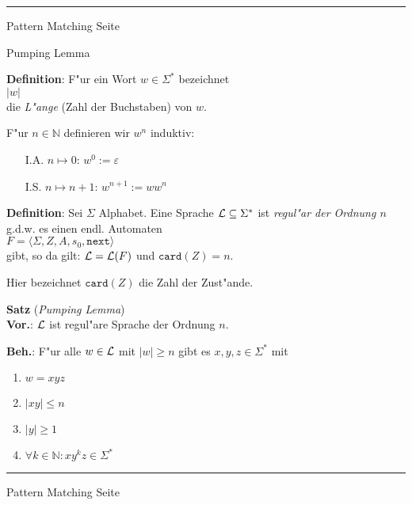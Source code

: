\begin{slide}{}
\vspace*{\fill}
\tiny \addtocounter{mypage}{1}
\rule{17cm}{1mm}
Pattern Matching \hspace*{\fill} Seite 
\end{slide}


\begin{slide}{}
\normalsize

\begin{center}
Pumping Lemma
\end{center}
\vspace*{0.5cm}

\footnotesize
\textbf{Definition}: F"ur ein Wort $w \in \Sigma^*$ bezeichnet \\[0.3cm]
\hspace*{1.3cm} $|w|$ \\[0.3cm]
die \emph{L"ange} (Zahl der Buchstaben) von $w$.

F"ur $n \in \mathbb{N}$ definieren wir $w^n$ induktiv:
\begin{enumerate}
\item[I.A.] $n \mapsto 0$:   \hspace*{2.5cm} $w^0 := \varepsilon$
\item[I.S.] $n \mapsto n+1$: \hspace*{1.3cm} $w^{n+1} := w w^n$

\end{enumerate}

\textbf{Definition}: Sei $\Sigma$ Alphabet. Eine Sprache ${\cal L} \subseteq \Sigma^*$
ist \emph{regul"ar der Ordnung $n$} g.d.w. es einen endl. Automaten \\[0.3cm]
\hspace*{1.3cm} $F = \langle \Sigma, Z, A, s_0, \mathtt{next} \rangle$ \\[0.3cm]
gibt, so da\3 gilt: \quad ${\cal L} = {\cal L}(F)$ und $\mathtt{card}(Z) = n$.

Hier bezeichnet $\texttt{card}(Z)$ die Zahl der Zust"ande.

\textbf{Satz} (\textsl{Pumping Lemma}) \\[0.3cm]
\textbf{Vor.}: ${\cal L}$ ist regul"are Sprache der Ordnung $n$.

\textbf{Beh.}: F"ur alle $w \in {\cal L}$ mit $|w| \geq n$ gibt es $x,y,z \in \Sigma^*$ mit
\begin{enumerate}
\item $w = xyz$
\item $|xy| \leq n$
\item $|y| \geq 1$
\item $\forall k \in \mathbb{N}: x y^k z \in \Sigma^*$
\end{enumerate}

\vspace*{\fill}
\tiny \addtocounter{mypage}{1}
\rule{17cm}{1mm}
Pattern Matching \hspace*{\fill} Seite 
\end{slide}

